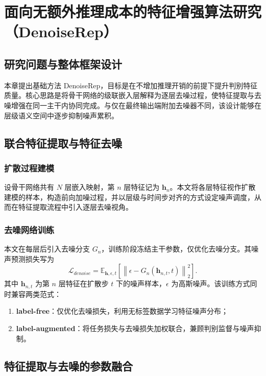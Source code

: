 ﻿\setlength{\baselineskip}{20pt}
\chapter{面向无额外推理成本的特征增强算法研究（DenoiseRep）}
\label{cha:chap3}

\section{研究问题与整体框架设计}
本章提出基础方法 DenoiseRep，目标是在不增加推理开销的前提下提升判别特征质量。核心思路是将骨干网络的级联嵌入层解释为逐层去噪过程，使特征提取与去噪增强在同一主干内协同完成。与仅在最终输出端附加去噪器不同，该设计能够在层级语义空间中逐步抑制噪声累积。

\section{联合特征提取与特征去噪}

\subsection{扩散过程建模}
设骨干网络共有 $N$ 层嵌入映射，第 $n$ 层特征记为 $\mathbf{h}_n$。本文将各层特征视作扩散建模的样本，构造前向加噪过程，并以层级与时间步对齐的方式设定噪声调度，从而在特征提取流程中引入逐层去噪视角。

\subsection{去噪网络训练}
本文在每层后引入去噪分支 $G_n$，训练阶段冻结主干参数，仅优化去噪分支。其噪声预测损失写为
\begin{equation}
\mathcal{L}_{denoise}=\mathbb{E}_{\mathbf{h},\epsilon,t}\left[\left\|\epsilon-G_n(\mathbf{h}_{n,t},t)\right\|_2^2\right].
\end{equation}
其中 $\mathbf{h}_{n,t}$ 为第 $n$ 层特征在扩散步 $t$ 下的噪声样本，$\epsilon$ 为高斯噪声。该训练方式同时兼容两类范式：
\begin{enumerate}
  \item \textbf{label-free}：仅优化去噪损失，利用无标签数据学习特征噪声分布；
  \item \textbf{label-augmented}：将任务损失与去噪损失加权联合，兼顾判别监督与噪声抑制。
\end{enumerate}

\section{特征提取与去噪的参数融合}


